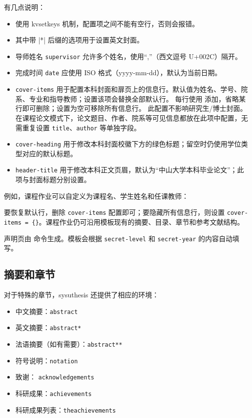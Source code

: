 \documentclass[a4paper]{ltxdoc}
\DeclareRobustCommand\env{\texttt}
\DeclareRobustCommand\pkg{\textsf}
\DeclareRobustCommand\cls{\textsf}
\DeclareRobustCommand\opt{\texttt}
\begin{document}
有几点说明：
\begin{itemize}
  \item {} 使用 \pkg{kvsetkeys} 机制，配置项之间不能有空行，否则会报错。
  \item 其中带 |*| 后缀的选项用于设置英文封面。
  \item 导师姓名 \opt{supervisor} 允许多个姓名，使用“,”（西文逗号 U+002C）隔开。
  \item 完成时间 \opt{date} 应使用 ISO 格式（yyyy-mm-dd），默认为当前日期。
  \item \opt{cover-items} 用于配置本科封面和扉页上的信息行。默认值为姓名、学号、院系、专业和指导教师；设置该项会替换全部默认行。
    每行使用  添加，省略某行即可删除；设置为空可移除所有信息行。
    此配置不影响研究生/博士封面。
    在课程论文模式下，论文题目、作者、院系等可见信息都放在此项中配置，无需重复设置 \opt{title}、\opt{author} 等单独字段。
  \item \opt{cover-heading} 用于修改本科封面校徽下方的绿色标题；留空时仍使用学位类型对应的默认标题。
  \item \opt{header-title} 用于修改本科正文页眉，默认为“中山大学本科毕业论文”；此项与封面标题分别设置。
\end{itemize}

例如，课程作业可以自定义为课程名、学生姓名和任课教师：
要恢复默认行，删除 \opt{cover-items} 配置即可；要隐藏所有信息行，则设置
\verb|cover-items = {}|。课程作业仍可沿用模板现有的摘要、目录、章节和参考文献结构。

\DescribeMacro{\copyrightpage}
声明页由  命令生成。模板会根据 \opt{secret-level} 和
\opt{secret-year} 的内容自动填写。

\clearpage
\subsection{摘要和章节}
对于特殊的章节，\cls{sysuthesis} 还提供了相应的环境：
\begin{itemize}
  \item 中文摘要：\env{abstract}
  \item 英文摘要：\env{abstract*}
  \item 法语摘要（如有需要）：\env{abstract**}
  \item 符号说明：\env{notation}
  \item 致谢：    \env{acknowledgements}
  \item 科研成果：\env{achievements}
  \item 科研成果列表：\env{theachievements}
\end{itemize}
\end{document}
